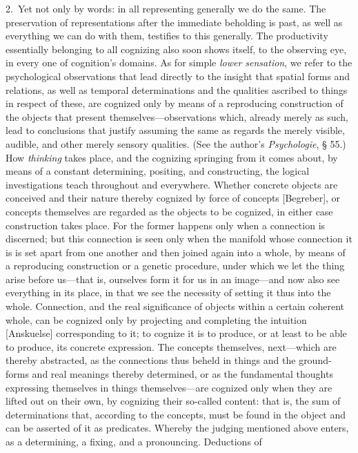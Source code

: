 \documentclass[12pt,a4paper]{book}
\begin{document}
2.~Yet not only by words: in all representing generally we do the same. The
preservation of representations after the immediate beholding is past, as well
as everything we can do with them, testifies to this generally. The productivity
essentially belonging to all cognizing also soon shows itself, to the observing
eye, in every one of cognition's domains. As for simple \emph{lower sensation},
we refer to the psychological observations that lead directly to the insight
that spatial forms and relations, as well as temporal determinations and the
qualities ascribed to things in respect of these, are cognized only by means of
a reproducing construction of the objects that present themselves---observations
which, already merely as such, lead to conclusions that justify assuming the same
as regards the merely visible, audible, and other merely sensory qualities. (See
the author's \textit{Psychologie}, § 55.) How \emph{thinking} takes place, and
the cognizing springing from it comes about, by means of a constant determining,
positing, and constructing, the logical investigations teach throughout and
everywhere. Whether concrete objects are conceived and their nature thereby
cognized by force of concepts [Begreber], or concepts themselves are regarded as
the objects to be cognized, in either case construction takes place. For the
former happens only when a connection is discerned; but this connection is seen
only when the manifold whose connection it is is set apart from one another and
then joined again into a whole, by means of a reproducing construction or a
genetic procedure, under which we let the thing arise before us---that is,
ourselves form it for us in an image---and now also see everything in its place,
in that we see the necessity of setting it thus into the whole. Connection, and
the real significance of objects within a certain coherent whole, can be
cognized only by projecting and completing the intuition [Anskuelse]
corresponding to it; to cognize it is to produce, or at least to be able to
produce, its concrete expression. The concepts themselves, next---which are
thereby abstracted, as the connections thus beheld in things and the
ground-forms and real meanings thereby determined, or as the fundamental
thoughts expressing themselves in things themselves---are cognized only when
they are lifted out on their own, by cognizing their so-called content: that is,
the sum of determinations that, according to the concepts, must be found in the
object and can be asserted of it as predicates. Whereby the judging mentioned
above enters, as a determining, a fixing, and a pronouncing. Deductions of
\end{document}
